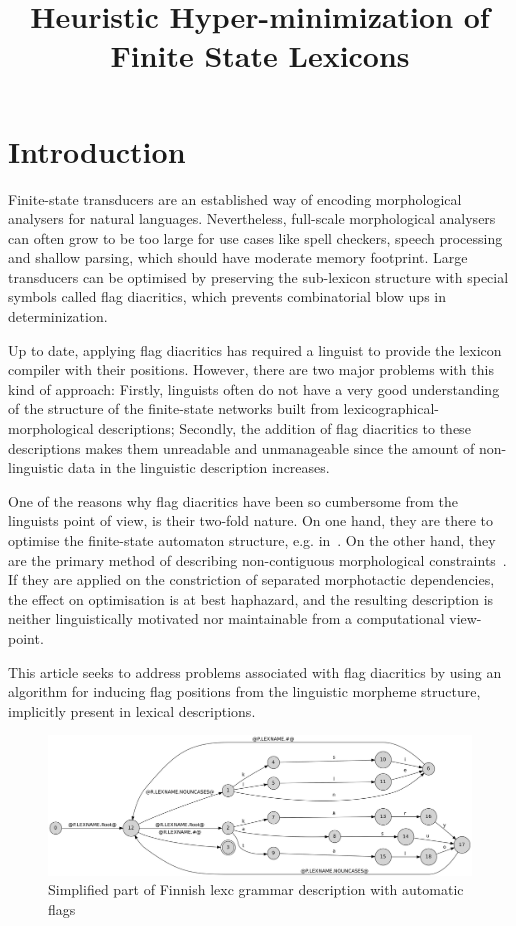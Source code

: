\documentclass[10pt, a4paper]{article}
\title{Heuristic Hyper-minimization of Finite State Lexicons}
\begin{document}
\maketitleabstract


\section{Introduction}

Finite-state transducers are an established way of encoding
morphological analysers for natural languages. Nevertheless,
full-scale morphological analysers can often grow to be too large for
use cases like spell checkers, speech processing and shallow parsing, which 
should have moderate memory footprint. Large transducers can be optimised by preserving the sub-lexicon structure with special symbols called flag diacritics, which prevents combinatorial blow ups in determinization.


Up to date, applying flag diacritics has required a linguist to provide
the lexicon compiler with their positions. However, there are two
major problems with this kind of approach: Firstly, linguists often do
not have a very good understanding of the structure of the
finite-state networks built from lexicographical-morphological
descriptions; Secondly, the addition of flag diacritics to these
descriptions makes them unreadable and unmanageable since the amount
of non-linguistic data in the linguistic description increases. 

One of the reasons why flag diacritics have been so cumbersome from
the linguists point of view, is their two-fold nature. On one hand,
they are there to optimise the finite-state automaton structure,
e.g. in~\cite{karttunen2006numbers}. On the other hand, they are the
primary method of describing non-contiguous morphological
constraints~\cite{beesley1998constraining}. If they are applied on the
constriction of separated morphotactic dependencies, the effect on
optimisation is at best haphazard, and the resulting description is
neither linguistically motivated nor maintainable from a computational
view-point.

This article seeks to address problems associated with flag diacritics
by using an algorithm for inducing flag positions from the linguistic
morpheme structure, implicitly present in lexical
descriptions.

\begin{figure}
    \includegraphics[width=\textwidth]{transducer.png}
     \caption{Simplified part of Finnish lexc grammar description with automatic flags
     \label{fig:lexc-fin-flag}}
\end{figure}
\end{document}
